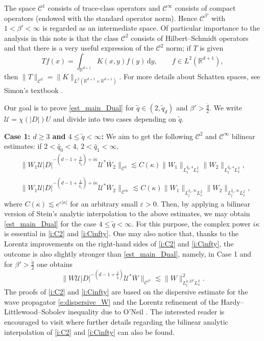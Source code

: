 \documentclass[a4paper]{amsart}
\numberwithin{equation}{section}%
\theoremstyle{plain}%
\theoremstyle{definition}
\theoremstyle{remark}%
\def\C{\mathcal{C}}
\def\C{\mathcal{C}}
\newcommand{\R}{{\mathbb R}}
\begin{document}
The space $\C^1$ consists of trace-class operators and $\C^\infty$ consists of compact operators (endowed with the standard operator norm). 
Hence $\C^{\beta'}$ with $1<\beta' < \infty$ is regarded as an intermediate space. Of particular importance to the analysis in this note is that the class $\C^2$ consists of Hilbert--Schmidt operators and that there is a very useful expression of the $\C^2$ norm; if $T$ is given 
\[
T f (x) = \int_{\R^{d+1}} K(x,y)f(y) \, \mathrm{d}y, \qquad f \in L^2(\R^{d+1}),
\]
then $\|T\|_{\C^2} = \|K\|_{L^2(\mathbb R^{d+1}\times\mathbb R^{d+1})}$. 
For more details about Schatten spaces, see Simon's textbook \cite{Simon}.

Our goal is to prove \eqref{est_main_Dual} for $\widetilde{q} \in (2,\widetilde{q}_d)$ and $\beta'>\frac{\widetilde{q}}{2}$. 
We write $\mathcal{U} = \chi(|D|)U$ and divide into two cases depending on $\widetilde{q}$.


\textbf{Case 1: $d \geq 3$ and $4 \leq \widetilde{q} <\infty$:}
We aim to get the following $\C^{2}$ and $\C^\infty$ bilinear estimates: if $2 < \widetilde{q_0} < 4$, $2 < \widetilde{q_1} < \infty$,
\begin{align}\label{i:C2}
& \|W_1\mathcal{U}|D|^{-(d-1+\frac{2}{\widetilde{q_0}})+i\kappa}\mathcal{U}^*\overline{W}_2\|_{\C^2}
\lesssim 
C(\kappa) 
\|W_1\|_{L_t^{\widetilde{q_0},4}L_x^2}\|W_2\|_{L_t^{\widetilde{q_0},4}L_x^2},\\
\label{i:Cinfty}
& \|W_1\mathcal{U}|D|^{-(d-1+\frac{2}{\widetilde{q_1}})+i\kappa}\mathcal{U}^*\overline{W}_2\|_{\C^\infty}
\lesssim 
C(\kappa) 
\|W_1\|_{L_t^{\widetilde{q_1},\infty}L_x^2}\|W_2\|_{L_t^{\widetilde{q_1},\infty}L_x^2},
\end{align}
where $C(\kappa) \lesssim e^{\varepsilon |\kappa|}$ for an arbitrary small $\varepsilon >0$. 
Then, by applying a bilinear version of Stein's analytic interpolation to the above estimates, we may obtain \eqref{est_main_Dual} for the case $4 \leq \widetilde{q} <\infty$. For this purpose, the complex power $i \kappa$ is essential in \eqref{i:C2} and \eqref{i:Cinfty}. 
One may also notice that, thanks to the Lorentz improvements on the right-hand sides of \eqref{i:C2} and \eqref{i:Cinfty}, the outcome is also slightly stronger than \eqref{est_main_Dual}, namely, in Case 1 and for $\beta'>\frac{\widetilde{q}}{2}$ one obtains
\[
\|W\mathcal{U}|D|^{-(d-1+\frac{2}{\widetilde{q}})}\mathcal{U}^*\overline{W}\|_{\C^{\beta'}}
\lesssim 
\|W\|_{L_t^{\widetilde{q}, 2\beta'}L_x^{2}}^2.
\]
The proofs of \eqref{i:C2} and \eqref{i:Cinfty} are based on the dispersive estimate for the wave propagator \eqref{e:dispersive_W} and the Lorentz refinement of the Hardy--Littlewood--Sobolev inequality due to O'Neil \cite{ONeil}. 
The interested reader is encouraged to visit \cite{BKS} where further details regarding the bilinear analytic interpolation of \eqref{i:C2} and \eqref{i:Cinfty} can also be found.
\end{document}
